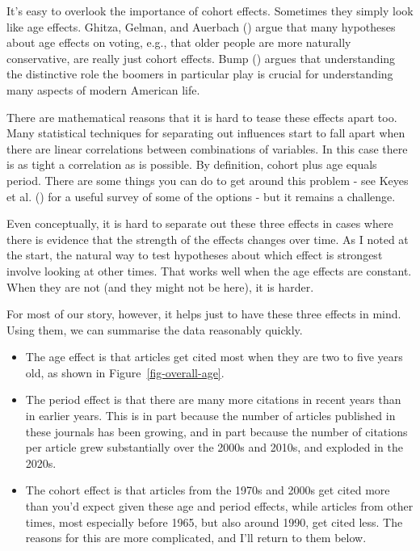 \documentclass[
  12pt,
  letterpaper,
  DIV=11,
  numbers=noendperiod]{scrartcl}
\providecommand{\tightlist}{%
  \setlength{\itemsep}{0pt}\setlength{\parskip}{0pt}}
\begin{document}
It's easy to overlook the importance of cohort effects. Sometimes they
simply look like age effects. Ghitza, Gelman, and Auerbach
() argue that many hypotheses about
age effects on voting, e.g., that older people are more naturally
conservative, are really just cohort effects. Bump
() argues that understanding the
distinctive role the boomers in particular play is crucial for
understanding many aspects of modern American life.

There are mathematical reasons that it is hard to tease these effects
apart too. Many statistical techniques for separating out influences
start to fall apart when there are linear correlations between
combinations of variables. In this case there is as tight a correlation
as is possible. By definition, cohort plus age equals period. There are
some things you can do to get around this problem - see Keyes et al.
() for a useful survey of some of the
options - but it remains a challenge.

Even conceptually, it is hard to separate out these three effects in
cases where there is evidence that the strength of the effects changes
over time. As I noted at the start, the natural way to test hypotheses
about which effect is strongest involve looking at other times. That
works well when the age effects are constant. When they are not (and
they might not be here), it is harder.

For most of our story, however, it helps just to have these three
effects in mind. Using them, we can summarise the data reasonably
quickly.

\begin{itemize}
\tightlist
\item
  The age effect is that articles get cited most when they are two to
  five years old, as shown in Figure~\ref{fig-overall-age}.
\item
  The period effect is that there are many more citations in recent
  years than in earlier years. This is in part because the number of
  articles published in these journals has been growing, and in part
  because the number of citations per article grew substantially over
  the 2000s and 2010s, and exploded in the 2020s.
\item
  The cohort effect is that articles from the 1970s and 2000s get cited
  more than you'd expect given these age and period effects, while
  articles from other times, most especially before 1965, but also
  around 1990, get cited less. The reasons for this are more
  complicated, and I'll return to them below.
\end{itemize}
\end{document}
